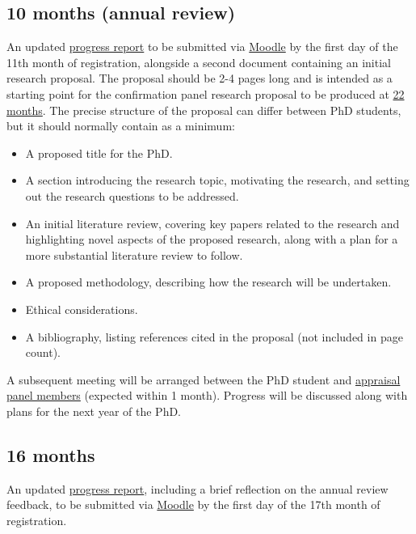 \documentclass[12pt,a4paper]{article}
\begin{document}
\subsection{10 months (annual review)} \label{sec:10months}
An updated \hyperref[sec:report]{progress report} to be submitted via \href{https://modules.lancaster.ac.uk/course/view.php?id=7050}{Moodle}  by the first day of the 11th month of registration, alongside a second document containing an initial research proposal. The proposal should be 2-4 pages long and is intended as a starting point for the confirmation panel research proposal to be produced at \hyperref[sec:22months]{22 months}. The precise structure of the proposal can differ between PhD students, but it should normally contain as a minimum:
\begin{itemize}
	\item A proposed title for the PhD.
	\item A section introducing the research topic, motivating the research, and setting out the research questions to be addressed.
	\item An initial literature review, covering key papers related to the research and highlighting novel aspects of the proposed research, along with a plan for a more substantial literature review to follow.
	\item A proposed methodology, describing how the research will be undertaken.
	\item Ethical considerations.
	\item A bibliography, listing references cited in the proposal (not included in page count).
\end{itemize}

A subsequent meeting will be arranged between the PhD student and \hyperref[sec:panel]{appraisal panel members} (expected within 1 month). Progress will be discussed along with plans for the next year of the PhD.

\subsection{16 months} \label{sec:16months}
An updated \hyperref[sec:report]{progress report}, including a brief reflection on the annual review feedback, to be submitted via \href{https://modules.lancaster.ac.uk/course/view.php?id=7050}{Moodle}  by the first day of the 17th month of registration.
\end{document}
